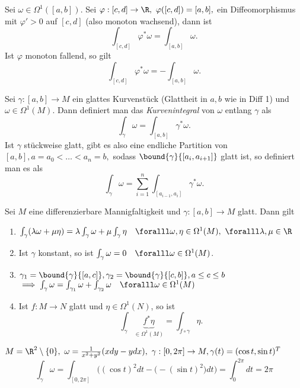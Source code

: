 \begin{lem}
	Sei $ \omega \in \Omega^1([a,b]) $. Sei $ \varphi:[c,d] \to \R,\ \varphi([c,d]) = [a,b], $ ein Diffeomorphismus mit $\varphi' > 0$ auf $[c,d]$ (also monoton wachsend), dann ist
	\[ \int_{[c,d]} \varphi^*\omega = \int_{[a,b]} \omega. \]
	Ist $\varphi$ monoton fallend, so gilt
	\[ \int_{[c,d]} \varphi^*\omega = - \int_{[a,b]} \omega. \]
\end{lem}

\begin{defn}[Kurvenintegral]
	Sei $ \gamma: [a,b] \to M $ ein glattes Kurvenstück (Glattheit in $a,b$ wie in Diff 1) und $\omega \in \Omega^1(M)$. Dann definiert man das \emph{Kurvenintegral} von $\omega$ entlang $\gamma$ als
	\[ \int_\gamma \omega = \int_{[a,b]} \gamma^*\omega. \]
	Ist $\gamma$ stückweise glatt, gibt es also eine endliche Partition von $[a,b], a=a_0 < \dots < a_n = b,$ sodass $\bound{\gamma}{[a_i,a_{i+1}]}$ glatt ist, so definiert man es als 
	$$ \int_{\gamma} \omega = \sum_{i=1}^{n} \int_{[a_{i-1},a_i]} \gamma^*\omega. $$
\end{defn}

\begin{lem}
	Sei $M$ eine differenzierbare Mannigfaltigkeit und $\gamma: [a,b] \to M$ glatt. Dann gilt
	\begin{enumerate}[label={\roman*})]
		\item $ \int_\gamma (\lambda \omega + \mu \eta) = \lambda \int_\gamma \omega + \mu \int_\gamma \eta \quad \foralll \omega,\eta \in \Omega^1(M), \ \foralll \lambda,\mu \in \R $
		\item Ist $\gamma$ konstant, so ist $ \int_\gamma \omega = 0 \quad \foralll \omega \in \Omega^1(M) $.
		\item $ \gamma_1 = \bound{\gamma}{[a,c]}, \gamma_2 = \bound{\gamma}{[c,b]}, a \leq c \leq b $\\
			$ \implies \int_\gamma \omega = \int_{\gamma_1} \omega + \int_{\gamma_2} \omega\quad \foralll \omega \in \Omega^1(M) $
		\item Ist $ f: M \to N $ glatt und $\eta \in \Omega^1(N)$, so ist
		\[ \int_\gamma \underbrace{f^*\eta}_{\in \Omega^1(M)} = \int_{f \circ \gamma} \eta. \]
	\end{enumerate}
\end{lem}

\begin{exmp*}
	$ M = \R^2 \setminus \{0\},\ \omega = \frac{1}{x^2+y^2}(xdy-ydx),\ \gamma: [0,2\pi] \to M, \gamma(t) = (\cos t,\sin t)^T $\\
	\[ \int_\gamma \omega = \int_{[0,2\pi]} \Big( (\cos t)^2 dt - \big(-(\sin t)^2 \big) dt \Big) = \int_0^{2\pi} dt = 2\pi \]
\end{exmp*}

